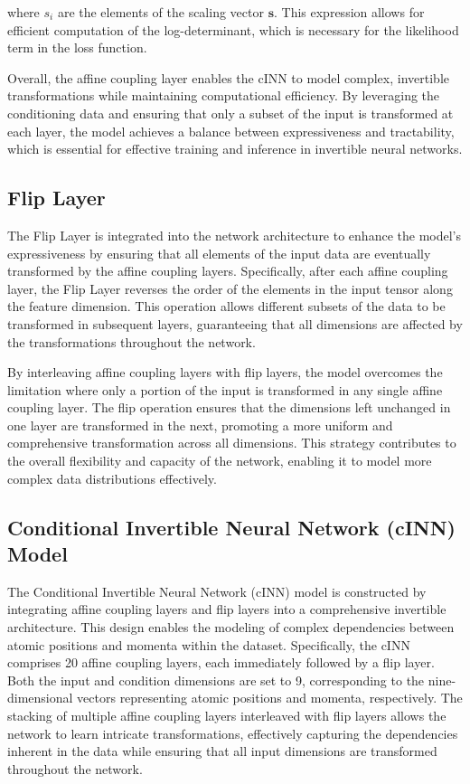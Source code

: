 \documentclass[11pt]{paper}
\begin{document}
where $s_i$ are the elements of the scaling vector $\mathbf{s}$. This expression allows for efficient computation of the log-determinant, which is necessary for the likelihood term in the loss function.

Overall, the affine coupling layer enables the cINN to model complex, invertible transformations while maintaining computational efficiency. By leveraging the conditioning data and ensuring that only a subset of the input is transformed at each layer, the model achieves a balance between expressiveness and tractability, which is essential for effective training and inference in invertible neural networks.

\subsection{Flip Layer}

The Flip Layer is integrated into the network architecture to enhance the model's expressiveness by ensuring that all elements of the input data are eventually transformed by the affine coupling layers. Specifically, after each affine coupling layer, the Flip Layer reverses the order of the elements in the input tensor along the feature dimension. This operation allows different subsets of the data to be transformed in subsequent layers, guaranteeing that all dimensions are affected by the transformations throughout the network.

By interleaving affine coupling layers with flip layers, the model overcomes the limitation where only a portion of the input is transformed in any single affine coupling layer. The flip operation ensures that the dimensions left unchanged in one layer are transformed in the next, promoting a more uniform and comprehensive transformation across all dimensions. This strategy contributes to the overall flexibility and capacity of the network, enabling it to model more complex data distributions effectively.

\subsection{Conditional Invertible Neural Network (cINN) Model}

The Conditional Invertible Neural Network (cINN) model is constructed by integrating affine coupling layers and flip layers into a comprehensive invertible architecture. This design enables the modeling of complex dependencies between atomic positions and momenta within the dataset. Specifically, the cINN comprises 20 affine coupling layers, each immediately followed by a flip layer. Both the input and condition dimensions are set to 9, corresponding to the nine-dimensional vectors representing atomic positions and momenta, respectively. The stacking of multiple affine coupling layers interleaved with flip layers allows the network to learn intricate transformations, effectively capturing the dependencies inherent in the data while ensuring that all input dimensions are transformed throughout the network.
\end{document}
